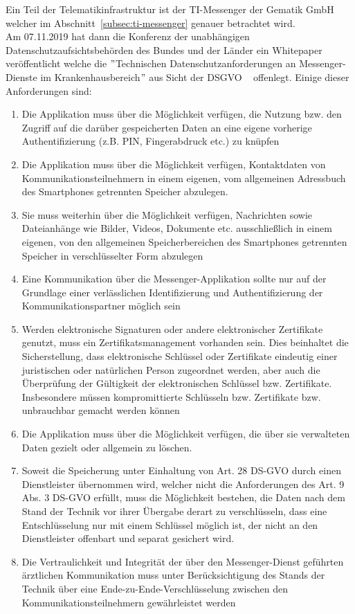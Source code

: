     Ein Teil der Telematikinfrastruktur ist der TI-Messenger der Gematik GmbH welcher im Abschnitt~\ref{subsec:ti-messenger} genauer betrachtet wird.\\
    Am 07.11.2019 hat dann die Konferenz der unabhängigen Datenschutzaufsichtsbehörden des Bundes und der Länder ein Whitepaper veröffentlicht welche die \("\)Technischen Datenschutzanforderungen an Messenger-Dienste im\linebreak
    Krankenhausbereich\("\) aus Sicht der DSGVO ~\cite{datenschutzkonferenz} offenlegt.
    Einige dieser Anforderungen sind:
    \begin{enumerate}[label={(\arabic*)}]
        \item Die Applikation muss über die Möglichkeit verfügen, die Nutzung bzw. den Zugriff
    auf die darüber gespeicherten Daten an eine eigene vorherige Authentifizierung (z.B.
    PIN, Fingerabdruck etc.) zu knüpfen
        \item Die Applikation muss über die Möglichkeit verfügen, Kontaktdaten von
    Kommunikationsteilnehmern in einem eigenen, vom allgemeinen Adressbuch des
    Smartphones getrennten Speicher abzulegen.
        \item Sie muss weiterhin über die Möglichkeit verfügen,
    Nachrichten sowie Dateianhänge wie Bilder, Videos, Dokumente etc. ausschließlich
    in einem eigenen, von den allgemeinen Speicherbereichen des Smartphones
    getrennten Speicher in verschlüsselter Form abzulegen
        \item Eine Kommunikation über die Messenger-Applikation sollte nur auf
    der Grundlage einer verlässlichen Identifizierung und Authentifizierung der
    Kommunikationspartner möglich sein
        \item Werden elektronische Signaturen oder andere elektronischer Zertifikate genutzt,
    muss ein Zertifikatsmanagement vorhanden sein. Dies beinhaltet die Sicherstellung,
    dass elektronische Schlüssel oder Zertifikate eindeutig einer juristischen oder
    natürlichen Person zugeordnet werden, aber auch die Überprüfung der Gültigkeit der
    elektronischen Schlüssel bzw. Zertifikate. Insbesondere müssen kompromittierte
    Schlüsseln bzw. Zertifikate bzw. unbrauchbar gemacht werden können
        \item Die Applikation muss über die Möglichkeit verfügen, die über sie verwalteten Daten
    gezielt oder allgemein zu löschen.
        \item Soweit die Speicherung unter Einhaltung von Art. 28 DS-GVO durch einen Dienstleister übernommen wird, welcher nicht die Anforderungen des Art. 9 Abs. 3 DS-GVO erfüllt,
    muss die Möglichkeit bestehen, die Daten nach dem Stand der Technik vor ihrer
    Übergabe derart zu verschlüsseln, dass eine Entschlüsselung nur mit einem
    Schlüssel möglich ist, der nicht an den Dienstleister offenbart und separat gesichert
    wird.
        \item Die Vertraulichkeit und Integrität der über den Messenger-Dienst geführten
    ärztlichen Kommunikation muss unter Berücksichtigung des Stands der Technik
    über eine Ende-zu-Ende-Verschlüsselung zwischen den
    Kommunikationsteilnehmern gewährleistet werden
    \end{enumerate}


